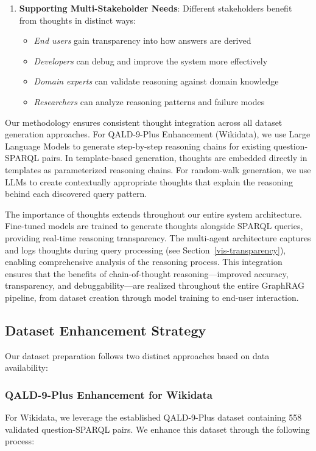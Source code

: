 \begin{enumerate}
    \item \textbf{Supporting Multi-Stakeholder Needs}: Different stakeholders benefit from thoughts in distinct ways:
    \begin{itemize}
        \item \textit{End users} gain transparency into how answers are derived
        \item \textit{Developers} can debug and improve the system more effectively
        \item \textit{Domain experts} can validate reasoning against domain knowledge
        \item \textit{Researchers} can analyze reasoning patterns and failure modes
    \end{itemize}
\end{enumerate}

Our methodology ensures consistent thought integration across all dataset generation approaches. For QALD-9-Plus Enhancement (Wikidata), we use Large Language Models to generate step-by-step reasoning chains for existing question-SPARQL pairs. In template-based generation, thoughts are embedded directly in templates as parameterized reasoning chains. For random-walk generation, we use LLMs to create contextually appropriate thoughts that explain the reasoning behind each discovered query pattern.

The importance of thoughts extends throughout our entire system architecture. Fine-tuned models are trained to generate thoughts alongside SPARQL queries, providing real-time reasoning transparency. The multi-agent architecture captures and logs thoughts during query processing (see Section~\ref{vis-transparency}), enabling comprehensive analysis of the reasoning process. This integration ensures that the benefits of chain-of-thought reasoning---improved accuracy, transparency, and debuggability---are realized throughout the entire GraphRAG pipeline, from dataset creation through model training to end-user interaction.

\subsection{Dataset Enhancement Strategy}
Our dataset preparation follows two distinct approaches based on data availability:

\subsubsection{QALD-9-Plus Enhancement for Wikidata}
For Wikidata, we leverage the established QALD-9-Plus dataset containing 558 validated question-SPARQL pairs. We enhance this dataset through the following process:

